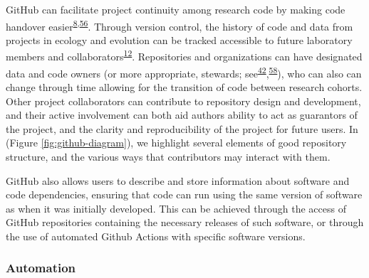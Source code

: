 GitHub can facilitate project continuity among research code by making code handover easier\textsuperscript{\protect\hyperlink{ref-4ny1onB0}{8},\protect\hyperlink{ref-D4C4k4ak}{56}}.
Through version control, the history of code and data from projects in ecology and evolution can be tracked accessible to future laboratory members and collaborators\textsuperscript{\protect\hyperlink{ref-3DKwn1sY}{12}}.
Repositories and organizations can have designated data and code owners (or more appropriate, stewards; see\textsuperscript{\protect\hyperlink{ref-iIEKCTLU}{42}},\textsuperscript{\protect\hyperlink{ref-s91uGRZ2}{58}}), who can also can change through time allowing for the transition of code between research cohorts.
Other project collaborators can contribute to repository design and development, and their active involvement can both aid authors ability to act as guarantors of the project, and the clarity and reproducibility of the project for future users.
In (Figure \ref{fig:github-diagram}), we highlight several elements of good repository structure, and the various ways that contributors may interact with them.

GitHub also allows users to describe and store information about software and code dependencies, ensuring that code can run using the same version of software as when it was initially developed.
This can be achieved through the access of GitHub repositories containing the necessary releases of such software, or through the use of automated Github Actions with specific software versions.

\hypertarget{automation}{%
\subsubsection{Automation}\label{automation}}

